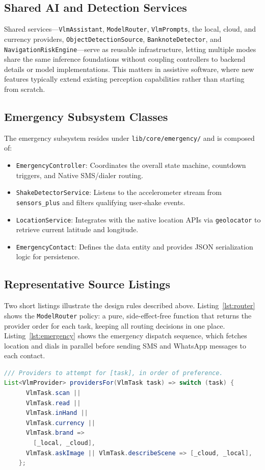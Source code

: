 \documentclass[a4paper]{report}
\begin{document}
\subsection{Shared AI and Detection Services}
Shared services---\texttt{VlmAssistant}, \texttt{ModelRouter}, \texttt{VlmPrompts}, the local, cloud, and currency providers, \texttt{ObjectDetectionSource}, \texttt{BanknoteDetector}, and \texttt{NavigationRiskEngine}---serve as reusable infrastructure, letting multiple modes share the same inference foundations without coupling controllers to backend details or model implementations. This matters in assistive software, where new features typically extend existing perception capabilities rather than starting from scratch.

\subsection{Emergency Subsystem Classes}
The emergency subsystem resides under \texttt{lib/core/emergency/} and is composed of:
\begin{itemize}
  \item \texttt{EmergencyController}: Coordinates the overall state machine, countdown triggers, and Native SMS/dialer routing.
  \item \texttt{ShakeDetectorService}: Listens to the accelerometer stream from \texttt{sensors\_plus} and filters qualifying user-shake events.
  \item \texttt{LocationService}: Integrates with the native location APIs via \texttt{geolocator} to retrieve current latitude and longitude.
  \item \texttt{EmergencyContact}: Defines the data entity and provides JSON serialization logic for persistence.
\end{itemize}

\subsection{Representative Source Listings}
Two short listings illustrate the design rules described above. Listing~\ref{lst:router} shows the \texttt{ModelRouter} policy: a pure, side-effect-free function that returns the provider order for each task, keeping all routing decisions in one place. Listing~\ref{lst:emergency} shows the emergency dispatch sequence, which fetches location and dials in parallel before sending SMS and WhatsApp messages to each contact.

\begin{lstlisting}[language=Java,caption={Task-aware provider routing policy (\texttt{model\_router.dart}).},label=lst:router]
/// Providers to attempt for [task], in order of preference.
List<VlmProvider> providersFor(VlmTask task) => switch (task) {
      VlmTask.scan ||
      VlmTask.read ||
      VlmTask.inHand ||
      VlmTask.currency ||
      VlmTask.brand =>
        [_local, _cloud],
      VlmTask.askImage || VlmTask.describeScene => [_cloud, _local],
    };
\end{lstlisting}
\end{document}
